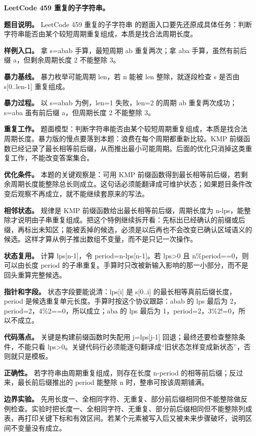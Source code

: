 \noindent\textbf{LeetCode 459 重复的子字符串。}

\textbf{题目说明。} LeetCode 459 重复的子字符串 的题面入口要先还原成具体任务：判断字符串能否由某个较短周期重复组成，本质是找合法周期长度。

\textbf{样例入口。} 拿 s=abab 手算，最短周期 ab 重复两次；拿 aba 手算，虽然有前后缀 a，但剩余周期长度 2 不能整除 3。

\textbf{暴力基线。} 暴力枚举可能周期 len，若 n 能被 len 整除，就逐段检查 s 是否由 s[0..len-1] 重复组成。

\textbf{暴力过程。} 以 s=abab 为例，len=1 失败，len=2 的周期 ab 重复两次成功；s=aba 虽有前后缀 a，但周期长度 2 不能整除 3。

\textbf{重复工作。} 题面模型：判断字符串能否由某个较短周期重复组成，本质是找合法周期长度。暴力版的慢点要落到本题：浪费在每个周期都重新比较。KMP 前缀函数已经记录了最长相等前后缀，从而推出最小可能周期。后面的优化只消掉这类重复工作，不能改变答案集合。

\textbf{优化条件。} 本题的关键观察是：可用 KMP 前缀函数得到最长相等前后缀，若剩余周期长度能整除总长则成立。这句话必须能翻译成可维护状态；如果题目条件改变后观察不再成立，就不能继续套原来的写法。

\textbf{相邻状态。} 规律是 KMP 前缀函数给出最长相等前后缀，周期长度为 n-lps，能整除才说明由子串重复组成。把这个特例继续拆开看：先标出已经确认的前缀或后缀，再标出未知区；能被丢掉的候选，必须是以后再也不会改变已确认区域语义的候选。这样才算从例子推出数组不变量，而不是只记一次操作。

\textbf{状态复用。} 计算 lps[n-1]，令 period=n-lps[n-1]。若 lps>0 且 n\%period==0，则可以由长度 period 的子串重复。手算时只改被新输入影响的那一小部分，而不是回头重算完整候选。

\textbf{指针和字段。} 状态字段要能说清：lps[i] 是 s[0..i] 的最长相等真前后缀长度，period 是候选重复单元长度。手算时按这个协议跟踪：abab 的 lps 最后为 2，period=2，4\%2==0，所以成立；aba 的 lps 最后为 1，period=2，3\%2!=0，所以不成立。

\textbf{代码落点。} 关键是构建前缀函数时失配用 j=lps[j-1] 回退；最终还要检查整除条件，不能只看 lps>0。关键代码行必须能逐句翻译成“旧状态怎样变成新状态”，否则就只是模板。

\textbf{正确性。} 若字符串由周期重复组成，则存在长度 n-period 的相等前后缀；反过来，最长前后缀推出的 period 能整除 n 时，整串可按该周期铺满。

\textbf{边界实验。} 先用长度一、全相同字符、无重复、部分前后缀相同但不能整除做反例检查。实验时把长度一、全相同字符、无重复、部分前后缀相同但不能整除列成表，再打印关键下标和有效区间。若某个元素被写入后又被未来步骤破坏，说明区间不变量没有成立。

